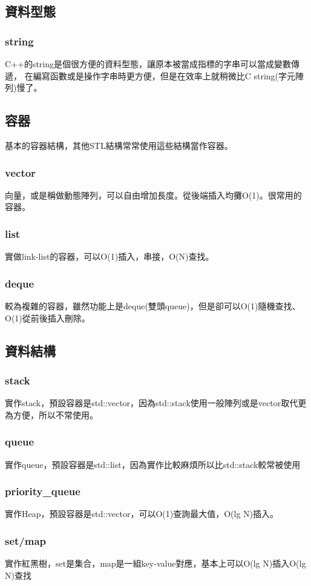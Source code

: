 \documentclass{article}
\begin{document}
\subsection{資料型態}
\subsubsection{string}
C++的string是個很方便的資料型態，讓原本被當成指標的字串可以當成變數傳遞，
在編寫函數或是操作字串時更方便，但是在效率上就稍微比C string(字元陣列)慢了。

\subsection{容器}
基本的容器結構，其他STL結構常常使用這些結構當作容器。
\subsubsection{vector}
向量，或是稱做動態陣列，可以自由增加長度。從後端插入均攤O(1)。很常用的容器。
\subsubsection{list}
實做link-list的容器，可以O(1)插入，串接，O(N)查找。
\subsubsection{deque}
較為複雜的容器，雖然功能上是deque(雙頭queue)，但是卻可以O(1)隨機查找、O(1)從前後插入刪除。

\subsection{資料結構}
\subsubsection{stack}
實作stack，預設容器是std::vector，因為std::stack使用一般陣列或是vector取代更為方便，所以不常使用。
\subsubsection{queue}
實作queue，預設容器是std::list，因為實作比較麻煩所以比std::stack較常被使用
\subsubsection{priority\_queue}
實作Heap，預設容器是std::vector，可以O(1)查詢最大值，O(lg N)插入。
\subsubsection{set/map}
實作紅黑樹，set是集合，map是一組key-value對應，基本上可以O(lg N)插入O(lg N)查找
\end{document}
